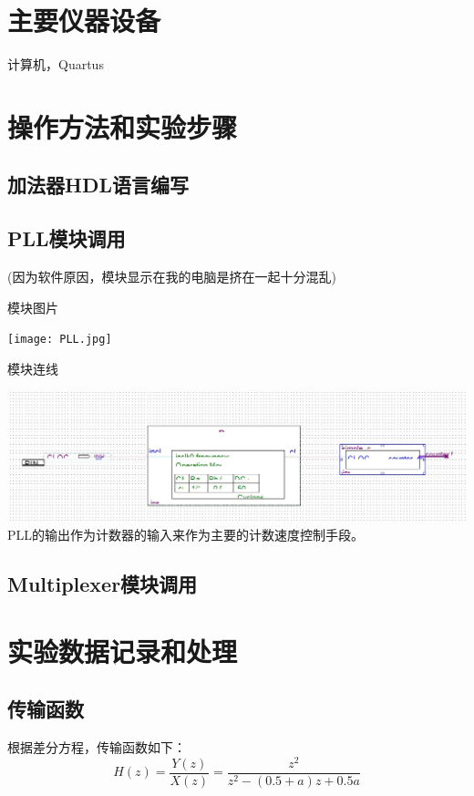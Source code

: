 \documentclass{zjureport}
\begin{document}
\section{主要仪器设备}
  计算机，Quartus

\section{操作方法和实验步骤}
  \subsection{加法器HDL语言编写}
    
  \subsection{PLL模块调用}
    (因为软件原因，模块显示在我的电脑是挤在一起十分混乱)
    \begin{clause}
      \item 模块图片
      \begin{center}
        \texttt{[image: PLL.jpg]}
      \end{center}
      \item 模块连线 
      \begin{center}
        \includegraphics[width=0.6\linewidth]{figures/Link_1.jpg}
        \\PLL的输出作为计数器的输入来作为主要的计数速度控制手段。
      \end{center}
    \end{clause}
  \subsection{Multiplexer模块调用}
    
\section{实验数据记录和处理}
  \subsection{传输函数}
    根据差分方程，传输函数如下：
    $$H(z) = \frac{Y(z)}{X(z)} = \frac{z^2}{z^2-(0.5+a)z+0.5a}$$
\end{document}
